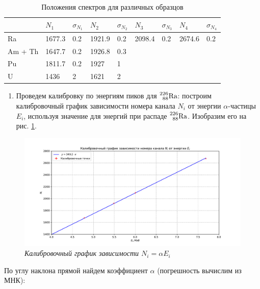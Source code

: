 \documentclass[a4paper,12pt]{article}
\begin{document}
\begin{table}[!ht]
    \centering
    \begin{tabular}{|l|l|l|l|l|l|l|l|l|}
        \hline
               & $N_1$ & $\sigma_{N_1}$ & $N_2$ & $\sigma_{N_2}$   & $N_3$ & $\sigma_{N_3}$   & $N_4$ & $\sigma_{N_4}$   \\ \hline
        Ra      & 1677.3 & 0.2 & 1921.9 & 0.2 & 2098.4 & 0.2 & 2674.6 & 0.2 \\ \hline
        Am + Th & 1647.7 & 0.2 & 1926.8 & 0.3 &      &     &      &     \\ \hline
        Pu      & 1811.7 & 0.2 & 1927   & 1   &      &     &      &     \\ \hline
        U       & 1436   & 2   & 1621   & 2   &      &     &      &     \\ \hline
    \end{tabular}
    \caption{Положения спектров для различных образцов}
    \label{table:1}
\end{table}

\begin{enumerate}[resume]
    \item Проведем калибровку по энергиям пиков для $\prescript{226}{88}{\text{Ra}}$: построим калибровочный график зависимости номера канала $N_i$ от энергии $\alpha$-частицы $E_i$, используя значение для энергий при распаде $\prescript{226}{88}{\text{Ra}}$. Изобразим его на рис. \ref{graph:cal_graph}.
\end{enumerate}


\FloatBarrier
\begin{figure}[!ht]
	\includegraphics[width=1.1\textwidth]{plots/cal_graph.pdf}
	\caption{\textit{Калибровочный график зависимости $N_i = \alpha E_i$}}
	\label{graph:cal_graph}
\end{figure}
\FloatBarrier

По углу наклона прямой найдем коэффициент $\alpha$ (погрешность вычислим из МНК):
\end{document}
